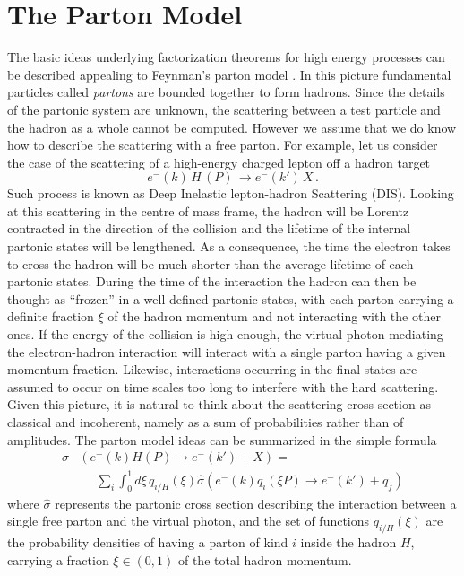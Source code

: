 \section{The Parton Model}
\label{sec:parton_model}
The basic ideas underlying factorization theorems for high energy processes can 
be described appealing to Feynman's parton model \cite{PhysRevLett.23.1415,Feynman:1973xc, Bjorken:1969ja}.
In this picture fundamental particles called \textit{partons} are bounded together to form hadrons.
Since the details of the partonic system are unknown, the scattering between a test particle and the hadron 
as a whole cannot be computed. However we assume that we do know how to describe the scattering with a free parton.
%
For example, let us consider the case of the scattering of a high-energy charged lepton off a
hadron target 
$$e^{-}(k)\,H\,(P)\,\rightarrow e^{-}(k')\,X \,. $$ 
Such process is known as Deep Inelastic lepton-hadron Scattering (DIS).
Looking at this scattering in the centre of mass frame, the hadron will be Lorentz contracted 
in the direction of the collision and the lifetime of the internal partonic states will be lengthened.
As a consequence, the time the electron takes to cross the hadron will be much shorter than the average lifetime of
each partonic states. During the time of the interaction the hadron can then be thought as ``frozen'' in 
a well defined partonic states, with each parton carrying a definite fraction $\xi$ of the hadron momentum
and not interacting with the other ones. 
If the energy of the collision is high enough, the virtual photon mediating the electron-hadron 
interaction will interact with a single parton having a given momentum fraction. Likewise, interactions
occurring in the final states are assumed to occur on time scales too long to interfere with the hard scattering.
%
Given this picture, it is natural to think about the scattering cross section as classical and incoherent,
namely as a sum of probabilities rather than of amplitudes. The parton model ideas can be summarized in the simple formula
\begin{align}
    \label{eq:parton_model}
    \sigma&\left(e^{-}\left(k\right)H\left(P\right)\rightarrow e^{-}\left(k'\right)+X\right) = \nonumber\\
     &\,\,\,\,\,\,\,\,\sum_i\int_0^1 d\xi\, q_{i/H}\left(\xi\right)
     \hat{\sigma}\left(e^{-}\left(k\right)q_i\left(\xi P\right)\rightarrow e^{-}\left(k'\right)+q_f\right)
\end{align}
where $\hat{\sigma}$ represents the partonic cross section describing the interaction between 
a single free parton and the virtual photon, and the set of functions $q_{i/H}\left(\xi\right)$ are the probability densities
of having a parton of kind $i$ inside the hadron $H$, carrying a fraction $\xi \in \left(0,1\right)$ of the total hadron momentum.

